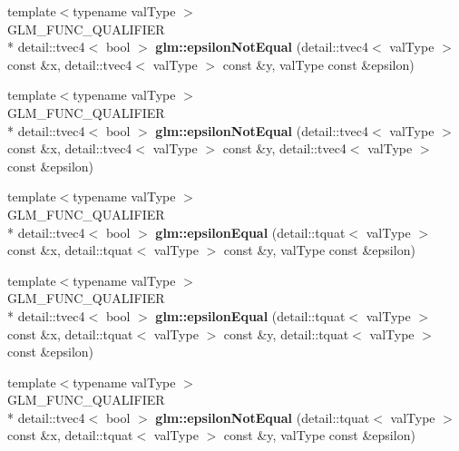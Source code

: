 \begin{DoxyCompactItemize}
\item 
\hypertarget{namespaceglm_a12d8fe2f853bf26756d761c6e21ef640}{{\footnotesize template$<$typename val\-Type $>$ }\\G\-L\-M\-\_\-\-F\-U\-N\-C\-\_\-\-Q\-U\-A\-L\-I\-F\-I\-E\-R \\*
detail\-::tvec4$<$ bool $>$ {\bfseries glm\-::epsilon\-Not\-Equal} (detail\-::tvec4$<$ val\-Type $>$ const \&x, detail\-::tvec4$<$ val\-Type $>$ const \&y, val\-Type const \&epsilon)}\label{namespaceglm_a12d8fe2f853bf26756d761c6e21ef640}

\item 
\hypertarget{namespaceglm_a1101f7185858450063577055752216e1}{{\footnotesize template$<$typename val\-Type $>$ }\\G\-L\-M\-\_\-\-F\-U\-N\-C\-\_\-\-Q\-U\-A\-L\-I\-F\-I\-E\-R \\*
detail\-::tvec4$<$ bool $>$ {\bfseries glm\-::epsilon\-Not\-Equal} (detail\-::tvec4$<$ val\-Type $>$ const \&x, detail\-::tvec4$<$ val\-Type $>$ const \&y, detail\-::tvec4$<$ val\-Type $>$ const \&epsilon)}\label{namespaceglm_a1101f7185858450063577055752216e1}

\item 
\hypertarget{namespaceglm_abf4c466d124db7dac9d451fb36d18d5b}{{\footnotesize template$<$typename val\-Type $>$ }\\G\-L\-M\-\_\-\-F\-U\-N\-C\-\_\-\-Q\-U\-A\-L\-I\-F\-I\-E\-R \\*
detail\-::tvec4$<$ bool $>$ {\bfseries glm\-::epsilon\-Equal} (detail\-::tquat$<$ val\-Type $>$ const \&x, detail\-::tquat$<$ val\-Type $>$ const \&y, val\-Type const \&epsilon)}\label{namespaceglm_abf4c466d124db7dac9d451fb36d18d5b}

\item 
\hypertarget{namespaceglm_a3f757d5217e752485fb2868b3a9fa771}{{\footnotesize template$<$typename val\-Type $>$ }\\G\-L\-M\-\_\-\-F\-U\-N\-C\-\_\-\-Q\-U\-A\-L\-I\-F\-I\-E\-R \\*
detail\-::tvec4$<$ bool $>$ {\bfseries glm\-::epsilon\-Equal} (detail\-::tquat$<$ val\-Type $>$ const \&x, detail\-::tquat$<$ val\-Type $>$ const \&y, detail\-::tquat$<$ val\-Type $>$ const \&epsilon)}\label{namespaceglm_a3f757d5217e752485fb2868b3a9fa771}

\item 
\hypertarget{namespaceglm_a685d1e7297b207ed576a26624634ca5f}{{\footnotesize template$<$typename val\-Type $>$ }\\G\-L\-M\-\_\-\-F\-U\-N\-C\-\_\-\-Q\-U\-A\-L\-I\-F\-I\-E\-R \\*
detail\-::tvec4$<$ bool $>$ {\bfseries glm\-::epsilon\-Not\-Equal} (detail\-::tquat$<$ val\-Type $>$ const \&x, detail\-::tquat$<$ val\-Type $>$ const \&y, val\-Type const \&epsilon)}\label{namespaceglm_a685d1e7297b207ed576a26624634ca5f}


\end{DoxyCompactItemize}
